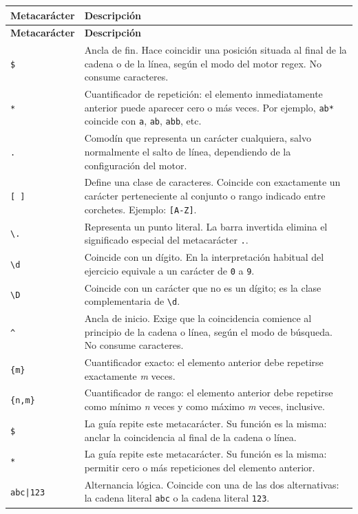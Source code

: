 \documentclass[11pt,a4paper]{article}
\newcommand{\regex}[1]{\texttt{#1}}
\begin{document}
\renewcommand{\arraystretch}{1.35}
\begin{longtable}{>{\centering\arraybackslash}p{} p{}}
\toprule
\textbf{Metacarácter} & \textbf{Descripción} \\
\midrule
\endfirsthead
\toprule
\textbf{Metacarácter} & \textbf{Descripción} \\
\midrule
\endhead
\regex{\$} & Ancla de fin. Hace coincidir una posición situada al final de la cadena o de la línea, según el modo del motor regex. No consume caracteres. \\
\regex{*} & Cuantificador de repetición: el elemento inmediatamente anterior puede aparecer cero o más veces. Por ejemplo, \regex{ab*} coincide con \texttt{a}, \texttt{ab}, \texttt{abb}, etc. \\
\regex{.} & Comodín que representa un carácter cualquiera, salvo normalmente el salto de línea, dependiendo de la configuración del motor. \\
\regex{[ ]} & Define una clase de caracteres. Coincide con exactamente un carácter perteneciente al conjunto o rango indicado entre corchetes. Ejemplo: \regex{[A-Z]}. \\
\regex{\textbackslash .} & Representa un punto literal. La barra invertida elimina el significado especial del metacarácter \regex{.}. \\
\regex{\textbackslash d} & Coincide con un dígito. En la interpretación habitual del ejercicio equivale a un carácter de \texttt{0} a \texttt{9}. \\
\regex{\textbackslash D} & Coincide con un carácter que no es un dígito; es la clase complementaria de \regex{\textbackslash d}. \\
\regex{\string^} & Ancla de inicio. Exige que la coincidencia comience al principio de la cadena o línea, según el modo de búsqueda. No consume caracteres. \\
\regex{\{m\}} & Cuantificador exacto: el elemento anterior debe repetirse exactamente \textit{m} veces. \\
\regex{\{n,m\}} & Cuantificador de rango: el elemento anterior debe repetirse como mínimo \textit{n} veces y como máximo \textit{m} veces, inclusive. \\
\regex{\$} & La guía repite este metacarácter. Su función es la misma: anclar la coincidencia al final de la cadena o línea. \\
\regex{*} & La guía repite este metacarácter. Su función es la misma: permitir cero o más repeticiones del elemento anterior. \\
\regex{abc|123} & Alternancia lógica. Coincide con una de las dos alternativas: la cadena literal \texttt{abc} o la cadena literal \texttt{123}. \\
\bottomrule
\end{longtable}
\end{document}
